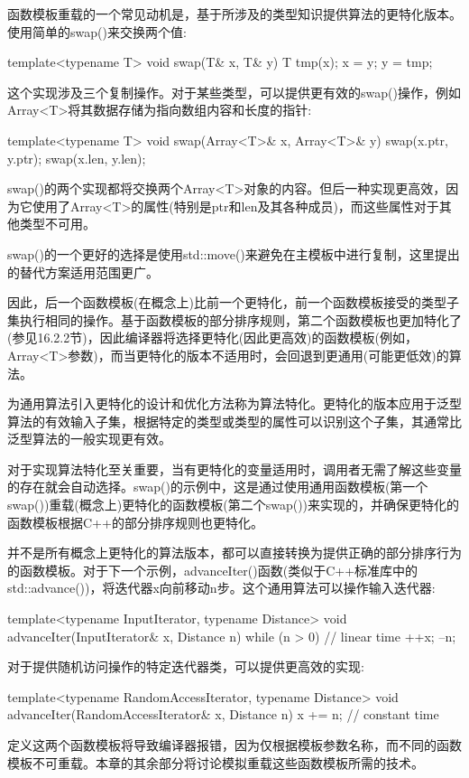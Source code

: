 
函数模板重载的一个常见动机是，基于所涉及的类型知识提供算法的更特化版本。使用简单的swap()来交换两个值:

\begin{cpp}
template<typename T>
void swap(T& x, T& y)
{
	T tmp(x);
	x = y;
	y = tmp;
}
\end{cpp}

这个实现涉及三个复制操作。对于某些类型，可以提供更有效的swap()操作，例如Array<T>将其数据存储为指向数组内容和长度的指针:

\begin{cpp}
template<typename T>
void swap(Array<T>& x, Array<T>& y)
{
	swap(x.ptr, y.ptr);
	swap(x.len, y.len);
}
\end{cpp}

swap()的两个实现都将交换两个Array<T>对象的内容。但后一种实现更高效，因为它使用了Array<T>的属性(特别是ptr和len及其各种成员)，而这些属性对于其他类型不可用。

\begin{notice}swap()的一个更好的选择是使用std::move()来避免在主模板中进行复制，这里提出的替代方案适用范围更广。
\end{notice}

因此，后一个函数模板(在概念上)比前一个更特化，前一个函数模板接受的类型子集执行相同的操作。基于函数模板的部分排序规则，第二个函数模板也更加特化了(参见16.2.2节)，因此编译器将选择更特化(因此更高效)的函数模板(例如，Array<T>参数)，而当更特化的版本不适用时，会回退到更通用(可能更低效)的算法。

为通用算法引入更特化的设计和优化方法称为算法特化。更特化的版本应用于泛型算法的有效输入子集，根据特定的类型或类型的属性可以识别这个子集，其通常比泛型算法的一般实现更有效。

对于实现算法特化至关重要，当有更特化的变量适用时，调用者无需了解这些变量的存在就会自动选择。swap()的示例中，这是通过使用通用函数模板(第一个swap())重载(概念上)更特化的函数模板(第二个swap())来实现的，并确保更特化的函数模板根据C++的部分排序规则也更特化。

并不是所有概念上更特化的算法版本，都可以直接转换为提供正确的部分排序行为的函数模板。对于下一个示例，advanceIter()函数(类似于C++标准库中的std::advance())，将迭代器x向前移动n步。这个通用算法可以操作输入迭代器:

\begin{cpp}
template<typename InputIterator, typename Distance>
void advanceIter(InputIterator& x, Distance n)
{
	while (n > 0) { // linear time
		++x;
		--n;
	}
}
\end{cpp}

对于提供随机访问操作的特定迭代器类，可以提供更高效的实现:

\begin{cpp}
template<typename RandomAccessIterator, typename Distance>
void advanceIter(RandomAccessIterator& x, Distance n) {
	x += n; // constant time
}
\end{cpp}

定义这两个函数模板将导致编译器报错，因为仅根据模板参数名称，而不同的函数模板不可重载。本章的其余部分将讨论模拟重载这些函数模板所需的技术。











